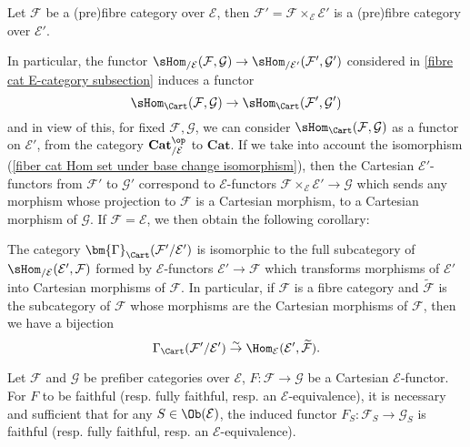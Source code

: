 \begin{corollary}\label{fibre cat base change is fibre}
Let $\mathcal{F}$ be a (pre)fibre category over $\mathcal{E}$, then $\mathcal{F}'=\mathcal{F}\times_\mathcal{E}\mathcal{E}'$ is a (pre)fibre category over $\mathcal{E}'$.
\end{corollary}
In particular, the functor $\sHom_{/\mathcal{E}}(\mathcal{F},\mathcal{G})\to \sHom_{/\mathcal{E}'}(\mathcal{F}',\mathcal{G}')$ considered in \cref{fibre cat E-category subsection} induces a functor
\[\sHom_{\Cart}(\mathcal{F},\mathcal{G})\to \sHom_{\Cart}(\mathcal{F}',\mathcal{G}')\]
and in view of this, for fixed $\mathcal{F},\mathcal{G}$, we can consider $\sHom_{\Cart}(\mathcal{F},\mathcal{G})$ as a functor on $\mathcal{E}'$, from the category $\mathbf{Cat}_{/\mathcal{E}}^{\op}$ to $\mathbf{Cat}$. If we take into account the isomorphism (\ref{fiber cat Hom set under base change isomorphism}), then the Cartesian $\mathcal{E}'$-functors from $\mathcal{F}'$ to $\mathcal{G}'$ correspond to $\mathcal{E}$-functors $\mathcal{F}\times_\mathcal{E}\mathcal{E}'\to \mathcal{G}$ which sends any morphism whose projection to $\mathcal{F}$ is a Cartesian morphism, to a Cartesian morphism of $\mathcal{G}$. If $\mathcal{F}=\mathcal{E}$, we then obtain the following corollary:
\begin{corollary}\label{fibre cat Cartesian section of base change bijection}
The category $\bm{\Gamma}_{\Cart}(\mathcal{F}'/\mathcal{E}')$ is isomorphic to the full subcategory of $\sHom_{/\mathcal{E}}(\mathcal{E}',\mathcal{F})$ formed by $\mathcal{E}$-functors $\mathcal{E}'\to \mathcal{F}$ which transforms morphisms of $\mathcal{E}'$ into Cartesian morphisms of $\mathcal{F}$. In particular, if $\mathcal{F}$ is a fibre category and $\widetilde{\mathcal{F}}$ is the subcategory of $\mathcal{F}$ whose morphisms are the Cartesian morphisms of $\mathcal{F}$, then we have a bijection
\[\Gamma_{\Cart}(\mathcal{F}'/\mathcal{E}')\stackrel{\sim}{\to }\Hom_{\mathcal{E}}(\mathcal{E}',\widetilde{\mathcal{F}}).\] 
\end{corollary}
\begin{proposition}\label{fibre cat E-functor fully faithful iff fiber}
Let $\mathcal{F}$ and $\mathcal{G}$ be prefiber categories over $\mathcal{E}$, $F:\mathcal{F}\to \mathcal{G}$ be a Cartesian $\mathcal{E}$-functor. For $F$ to be faithful (resp. fully faithful, resp. an $\mathcal{E}$-equivalence), it is necessary and sufficient that for any $S\in\Ob(\mathcal{E})$, the induced functor $F_S:\mathcal{F}_S\to \mathcal{G}_S$ is faithful (resp. fully faithful, resp. an $\mathcal{E}$-equivalence).
\end{proposition}
